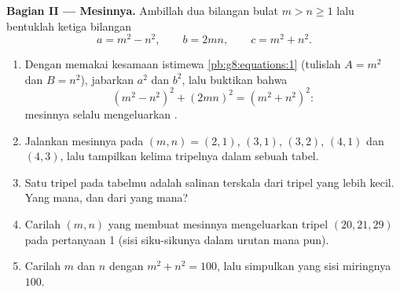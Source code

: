 \begin{problem}[{Soal akhir pekan --- segitiga siku-siku berbilangan
bulat, dan kesamaan $(m^2 - n^2)^2 + (2mn)^2 = (m^2 + n^2)^2$ yang
membangkitkan semuanya}]
\medskip
\noindent\textbf{Bagian II --- Mesinnya.}
Ambillah dua bilangan bulat $m > n \geq 1$ lalu bentuklah ketiga bilangan
\[
a = m^2 - n^2,
\qquad
b = 2mn,
\qquad
c = m^2 + n^2 .
\]
\begin{enumerate}[resume]
  \item Dengan memakai kesamaan istimewa
        \cref{pb:g8:equations:1} (tulislah $A = m^2$ dan $B = n^2$),
        jabarkan $a^2$ dan $b^2$, lalu buktikan bahwa
        \[
        \left(m^2 - n^2\right)^2 + (2mn)^2
        = \left(m^2 + n^2\right)^2 :
        \]
        mesinnya selalu mengeluarkan .
  \item Jalankan mesinnya pada $(m, n) = (2, 1)$, $(3, 1)$, $(3, 2)$,
        $(4, 1)$ dan $(4, 3)$, lalu tampilkan kelima tripelnya dalam
        sebuah tabel.
  \item Satu tripel pada tabelmu adalah salinan terskala dari tripel
        yang lebih kecil. Yang mana, dan dari yang mana?
  \item Carilah $(m, n)$ yang membuat mesinnya mengeluarkan tripel
        $(20, 21, 29)$ pada pertanyaan 1 (sisi siku-sikunya dalam
        urutan mana pun).
  \item Carilah $m$ dan $n$ dengan $m^2 + n^2 = 100$, lalu simpulkan
         yang sisi miringnya $100$.
\end{enumerate}


\end{problem}
